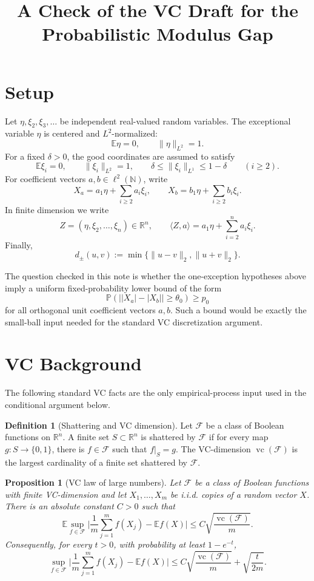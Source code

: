 \documentclass[11pt]{amsart}
\title{A Check of the VC Draft for the Probabilistic Modulus Gap}
\author{}
\numberwithin{equation}{section}
\newtheorem{proposition}[theorem]{Proposition}
\theoremstyle{definition}
\newtheorem{definition}[theorem]{Definition}
\theoremstyle{remark}
\newcommand{\E}{\mathbb E}
\newcommand{\Prob}{\mathbb P}
\newcommand{\N}{\mathbb N}
\newcommand{\R}{\mathbb R}
\newcommand{\vc}{\operatorname{vc}}
\newcommand{\abs}[1]{\lvert #1 \rvert}
\newcommand{\norm}[1]{\lVert #1 \rVert}
\newcommand{\distpm}[2]{d_{\pm}(#1,#2)}
\begin{document}
\maketitle

\section{Setup}

Let \(\eta,\xi_2,\xi_3,\dots\) be independent real-valued random variables.
The exceptional variable \(\eta\) is centered and \(L^2\)-normalized:
\[
        \E\eta=0,\qquad \norm{\eta}_{L^2}=1.
\]
For a fixed \(\delta>0\), the good coordinates are assumed to satisfy
\[
        \E\xi_i=0,\qquad \norm{\xi_i}_{L^2}=1,\qquad
        \delta\le \norm{\xi_i}_{L^1}\le 1-\delta
        \qquad (i\ge2).
\]
For coefficient vectors \(a,b\in\ell^2(\N)\), write
\[
X_a=a_1\eta+\sum_{i\ge2}a_i\xi_i,\qquad
X_b=b_1\eta+\sum_{i\ge2}b_i\xi_i.
\]
In finite dimension we write
\[
Z=(\eta,\xi_2,\ldots,\xi_n)\in\R^n,\qquad
\langle Z,a\rangle=a_1\eta+\sum_{i=2}^n a_i\xi_i .
\]
Finally,
\[
        \distpm{u}{v}:=\min\{\norm{u-v}_2,\norm{u+v}_2\}.
\]

The question checked in this note is whether the one-exception hypotheses
above imply a uniform fixed-probability lower bound of the form
\[
\Prob\left(\bigl||X_a|-|X_b|\bigr|\ge\theta_0\right)\ge p_0
\]
for all orthogonal unit coefficient vectors \(a,b\).  Such a bound would be
exactly the small-ball input needed for the standard VC discretization
argument.

\section{VC Background}

The following standard VC facts are the only empirical-process input used in
the conditional argument below.

\begin{definition}[Shattering and VC dimension]
Let \(\mathcal F\) be a class of Boolean functions on \(\R^n\).  A finite set
\(S\subset\R^n\) is shattered by \(\mathcal F\) if for every map
\(g:S\to\{0,1\}\), there is \(f\in\mathcal F\) such that \(f|_S=g\).  The
VC-dimension \(\vc(\mathcal F)\) is the largest cardinality of a finite set
shattered by \(\mathcal F\).
\end{definition}

\begin{proposition}[VC law of large numbers]\label{prop:vc-lln}
Let \(\mathcal F\) be a class of Boolean functions with finite VC-dimension and
let \(X_1,\ldots,X_m\) be i.i.d. copies of a random vector \(X\).  There is an
absolute constant \(C>0\) such that
\[
\E\sup_{f\in\mathcal F}
\abs{\frac1m\sum_{j=1}^m f(X_j)-\E f(X)}
\le C\sqrt{\frac{\vc(\mathcal F)}{m}}.
\]
Consequently, for every \(t>0\), with probability at least \(1-e^{-t}\),
\[
\sup_{f\in\mathcal F}
\abs{\frac1m\sum_{j=1}^m f(X_j)-\E f(X)}
\le C\sqrt{\frac{\vc(\mathcal F)}{m}}+\sqrt{\frac{t}{2m}}.
\]
\end{proposition}
\end{document}
